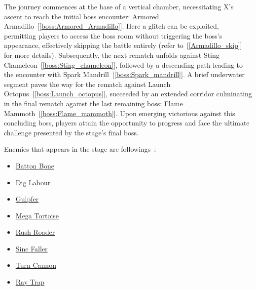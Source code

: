 The journey commences at the base of a vertical chamber, necessitating X's ascent to reach the initial boss encounter: Armored Armadillo~[\ref{boss:Armored_Armadillo}]. Here a glitch can be exploited, permitting players to access the boss room without triggering the boss's appearance, effectively skipping the battle entirely (refer to~[\ref{Armadillo_skip}] for more details). Subsequently, the next rematch unfolds against Sting Chameleon~[\ref{boss:Sting_chameleon}], followed by a descending path leading to the encounter with Spark Mandrill~[\ref{boss:Spark_mandrill}]. A brief underwater segment paves the way for the rematch against Launch Octopus~[\ref{boss:Launch_octopus}], succeeded by an extended corridor culminating in the final rematch against the last remaining boss: Flame Mammoth~[\ref{boss:Flame_mammoth}].
Upon emerging victorious against this concluding boss, players attain the opportunity to progress and face the ultimate challenge presented by the stage's final boss.

Enemies that appears in the stage are followings~\cite{wiki:sigma_stages}:
\begin{itemize}
	\item \hyperlink{enem:Batton_Bone}{Batton Bone}
	\item \hyperlink{enem:Dig_Labour}{Dig Labour}
	\item \hyperlink{enem:Gulpfer}{Gulpfer}
	\item \hyperlink{enem:Mega_Tortoise}{Mega Tortoise}
	\item \hyperlink{enem:Rush_Roader}{Rush Roader}
	\item \hyperlink{enem:Sine_Faller}{Sine Faller}
	\item \hyperlink{enem:Turn_Cannon}{Turn Cannon}
	\item \hyperlink{enem:Ray_Trap}{Ray Trap}
\end{itemize} 

